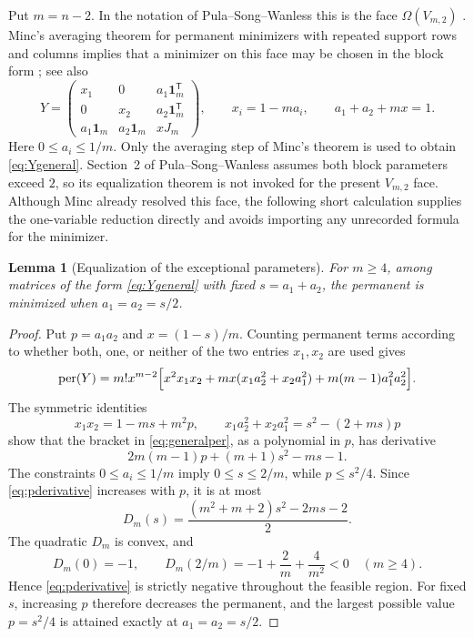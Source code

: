 \documentclass[11pt]{article}
\newtheorem{lemma}[theorem]{Lemma}
\theoremstyle{remark}
\newcommand{\per}{\operatorname{per}}
\newcommand{\one}{\mathbf{1}}
\begin{document}
Put $m=n-2$.  In the notation of Pula--Song--Wanless this is the face
$\Omega(V_{m,2})$ \cite{PulaSongWanless2011}.  Minc's averaging theorem for
permanent minimizers with repeated support rows and columns implies that a
minimizer on this face may be chosen in the block form
\cite[Theorem~1]{Minc1984}; see also \cite{PulaSongWanless2011}
\begin{equation}\label{eq:Ygeneral}
 Y=
 \begin{pmatrix}
 x_1&0&a_1\one_m^{\mathsf T}\\
 0&x_2&a_2\one_m^{\mathsf T}\\
 a_1\one_m&a_2\one_m&xJ_m
 \end{pmatrix},
 \qquad
 x_i=1-ma_i,
 \qquad
 a_1+a_2+mx=1.
\end{equation}
Here $0\le a_i\le1/m$.  Only the averaging step of Minc's theorem is used to
obtain \eqref{eq:Ygeneral}.  Section~2 of Pula--Song--Wanless assumes both block
parameters exceed $2$, so its equalization theorem is not invoked for the
present $V_{m,2}$ face.  Although Minc already resolved this face, the following
short calculation supplies the one-variable reduction directly and avoids
importing any unrecorded formula for the minimizer.

\begin{lemma}[Equalization of the exceptional parameters]\label{lem:equalize}
For $m\ge4$, among matrices of the form \eqref{eq:Ygeneral} with fixed
$s=a_1+a_2$, the permanent is minimized when $a_1=a_2=s/2$.
\end{lemma}

\begin{proof}
Put $p=a_1a_2$ and $x=(1-s)/m$.  Counting permanent terms according to whether
both, one, or neither of the two entries $x_1,x_2$ are used gives
\begin{equation}\label{eq:generalper}
 \per(Y)=m!x^{m-2}\Bigl[
 x^2x_1x_2+mx(x_1a_2^2+x_2a_1^2)+m(m-1)a_1^2a_2^2
 \Bigr].
\end{equation}
The symmetric identities
\[
 x_1x_2=1-ms+m^2p,
 \qquad
 x_1a_2^2+x_2a_1^2=s^2-(2+ms)p
\]
show that the bracket in \eqref{eq:generalper}, as a polynomial in $p$, has
derivative
\begin{equation}\label{eq:pderivative}
 2m(m-1)p+(m+1)s^2-ms-1.
\end{equation}
The constraints $0\le a_i\le1/m$ imply $0\le s\le2/m$, while
$p\le s^2/4$.  Since \eqref{eq:pderivative} increases with $p$, it is at most
\[
 D_m(s)=\frac{(m^2+m+2)s^2-2ms-2}{2}.
\]
The quadratic $D_m$ is convex, and
\[
 D_m(0)=-1,
 \qquad
 D_m(2/m)=-1+\frac2m+\frac4{m^2}<0
 \quad(m\ge4).
\]
Hence \eqref{eq:pderivative} is strictly negative throughout the feasible
region.  For fixed $s$, increasing $p$ therefore decreases the permanent, and
the largest possible value $p=s^2/4$ is attained exactly at
$a_1=a_2=s/2$.
\end{proof}
\end{document}
